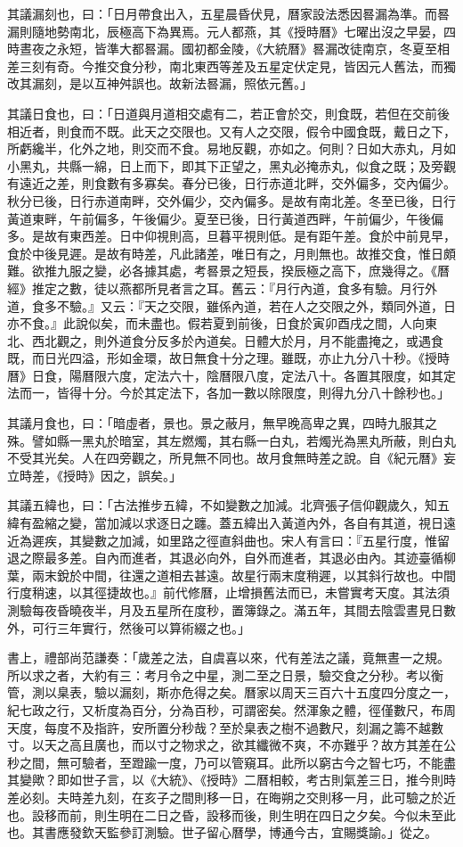 其議漏刻也，曰：「日月帶食出入，五星晨昏伏見，曆家設法悉因晷漏為準。而晷漏則隨地勢南北，辰極高下為異焉。元人都燕，其《授時曆》七曜出沒之早晏，四時晝夜之永短，皆準大都晷漏。國初都金陵，《大統曆》晷漏改徒南京，冬夏至相差三刻有奇。今推交食分秒，南北東西等差及五星定伏定見，皆因元人舊法，而獨改其漏刻，是以互神舛誤也。故新法晷漏，照依元舊。」

其議日食也，曰：「日道與月道相交處有二，若正會於交，則食既，若但在交前後相近者，則食而不既。此天之交限也。又有人之交限，假令中國食既，戴日之下，所虧纔半，化外之地，則交而不食。易地反觀，亦如之。何則？日如大赤丸，月如小黑丸，共縣一綿，日上而下，即其下正望之，黑丸必掩赤丸，似食之既；及旁觀有遠近之差，則食數有多寡矣。春分已後，日行赤道北畔，交外偏多，交內偏少。秋分已後，日行赤道南畔，交外偏少，交內偏多。是故有南北差。冬至已後，日行黃道東畔，午前偏多，午後偏少。夏至已後，日行黃道西畔，午前偏少，午後偏多。是故有東西差。日中仰視則高，旦暮平視則低。是有距午差。食於中前見早，食於中後見遲。是故有時差，凡此諸差，唯日有之，月則無也。故推交食，惟日頗難。欲推九服之變，必各據其處，考晷景之短長，揆辰極之高下，庶幾得之。《曆經》推定之數，徒以燕都所見者言之耳。舊云：『月行內道，食多有驗。月行外道，食多不驗。』又云：『天之交限，雖係內道，若在人之交限之外，類同外道，日亦不食。』此說似矣，而未盡也。假若夏到前後，日食於寅卯酉戌之間，人向東北、西北觀之，則外道食分反多於內道矣。日體大於月，月不能盡掩之，或遇食既，而日光四溢，形如金環，故日無食十分之理。雖既，亦止九分八十秒。《授時曆》日食，陽曆限六度，定法六十，陰曆限八度，定法八十。各置其限度，如其定法而一，皆得十分。今於其定法下，各加一數以除限度，則得九分八十餘秒也。」

其議月食也，曰：「暗虛者，景也。景之蔽月，無早晚高卑之異，四時九服其之殊。譬如縣一黑丸於暗室，其左燃燭，其右縣一白丸，若燭光為黑丸所蔽，則白丸不受其光矣。人在四旁觀之，所見無不同也。故月食無時差之說。自《紀元曆》妄立時差，《授時》因之，誤矣。」

其議五緯也，曰：「古法推步五緯，不如變數之加減。北齊張子信仰觀歲久，知五緯有盈縮之變，當加減以求逐日之躔。蓋五緯出入黃道內外，各自有其道，視日遠近為遲疾，其變數之加減，如里路之徑直斜曲也。宋人有言曰：『五星行度，惟留退之際最多差。自內而進者，其退必向外，自外而進者，其退必由內。其迹臺循柳葉，兩末銳於中間，往還之道相去甚遠。故星行兩末度稍遲，以其斜行故也。中間行度稍速，以其徑捷故也。』前代修曆，止增損舊法而已，未嘗實考天度。其法須測驗每夜昏曉夜半，月及五星所在度秒，置簿錄之。滿五年，其間去陰雲晝見日數外，可行三年實行，然後可以算術綴之也。」

書上，禮部尚范謙奏：「歲差之法，自虞喜以來，代有差法之議，竟無晝一之規。所以求之者，大約有三：考月令之中星，測二至之日景，驗交食之分秒。考以衡管，測以臬表，驗以漏刻，斯亦危得之矣。曆家以周天三百六十五度四分度之一，紀七政之行，又析度為百分，分為百秒，可謂密矣。然渾象之體，徑僅數尺，布周天度，每度不及指許，安所置分秒哉？至於臬表之樹不過數尺，刻漏之籌不越數寸。以天之高且廣也，而以寸之物求之，欲其纖微不爽，不亦難乎？故方其差在公秒之間，無可驗者，至蹬踰一度，乃可以管窺耳。此所以窮古今之智七巧，不能盡其變歟？即如世子言，以《大統》、《授時》二曆相較，考古則氣差三日，推今則時差必刻。夫時差九刻，在亥子之間則移一日，在晦朔之交則移一月，此可驗之於近也。設移而前，則生明在二日之昏，設移而後，則生明在四日之夕矣。今似未至此也。其書應發欽天監參訂測驗。世子留心曆學，博通今古，宜賜獎諭。」從之。

